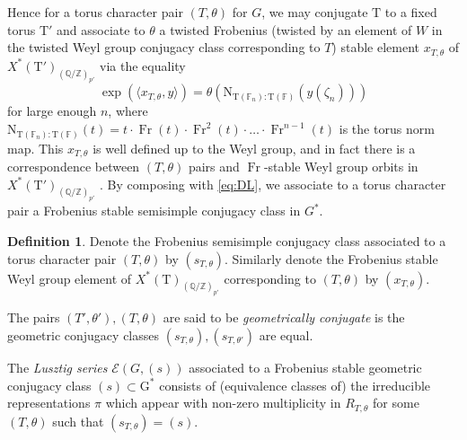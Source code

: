 \documentclass[12pt, reqno]{amsart}
\theoremstyle{definition}
\newtheorem{definition}[theorem]{Definition}
\theoremstyle{definition}
\theoremstyle{definition}
\newcommand{\aFieldNorm}{\mathrm{N}}
\newcommand{\finiteField}{\mathbb{F}}
\newcommand{\finiteFieldExtension}[1]{\finiteField_{#1}}
\newcommand{\Frobenius}{\operatorname{Fr}}
\newcommand{\algebraicGroup}[1]{\boldsymbol{\mathrm{#1}}}
\newcommand{\LusztigSeries}[2]{\mathcal{E}\left(#1, (#2)\right)}
\begin{document}
Hence for a torus character pair $(T,\theta)$ for $G$, we may conjugate $\algebraicGroup{T}$ to a fixed torus $\algebraicGroup{T}'$ and associate to $\theta$ a twisted Frobenius (twisted by an element of $W$ in the twisted Weyl group conjugacy class corresponding to $T$) stable element $x_{T,\theta}$ of $X^*(\algebraicGroup{T}')_{(\mathbb{Q}/\mathbb{Z})_{p'}}$ via the equality
\[
    \exp(\langle x_{T,\theta},y\rangle) = \theta(\aFieldNorm_{\algebraicGroup{T}(\finiteFieldExtension{n}):\algebraicGroup{T}(\finiteField)}(y(\zeta_n)))
\]
for large enough $n$, where $\aFieldNorm_{\algebraicGroup{T}(\finiteFieldExtension{n}):\algebraicGroup{T}(\finiteField)}(t) = t\cdot \Frobenius(t)\cdot \Frobenius^2(t)\cdot  \hdots \cdot \Frobenius^{n-1}(t)$ is the torus norm map. This $x_{T,\theta}$ is well defined up to the Weyl group, and in fact there is a correspondence between $(T,\theta)$ pairs and $\Frobenius$-stable Weyl group orbits in $X^*(\algebraicGroup{T}')_{(\mathbb{Q}/\mathbb{Z})_{p'}}$ \cite[Corollary 13.9]{DigneMichel2020}.  By composing with \eqref{eq:DL}, we associate to a torus character pair a Frobenius stable semisimple conjugacy class in $G^*$.

\begin{definition}
    Denote the Frobenius semisimple conjugacy class associated to a torus character pair $(T,\theta)$ by $(s_{T,\theta})$. Similarly denote the Frobenius stable Weyl group element of $X^*(\algebraicGroup{T})_{(\mathbb{Q}/\mathbb{Z})_{p'}}$ corresponding to $(T,\theta)$ by $(x_{T,\theta}).$

    The pairs $(T',\theta'),(T,\theta)$ are said to be \emph{geometrically conjugate} is the geometric conjugacy classes $(s_{T,\theta}), (s_{T,\theta'})$ are equal.
    
    The \emph{Lusztig series} $\LusztigSeries{G}{s}$ associated to a Frobenius stable geometric conjugacy class $(s) \subset \algebraicGroup{G}^*$ consists of (equivalence classes of) the irreducible representations $\pi$ which appear with non-zero multiplicity in $R_{T, \theta}$ for some $(T,\theta)$ such that $(s_{T,\theta}) = (s)$.
\end{definition}
\end{document}
